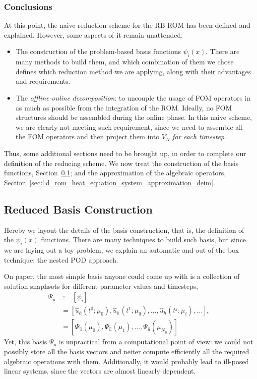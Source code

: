 \documentclass[../main.tex]{subfiles}
\begin{document}
\subsubsection{Conclusions}
At this point, the naive reduction scheme for the RB-ROM has been defined and explained.
However, some aspects of it remain unattended:
\begin{itemize}
    \item The construction of the problem-based basis functions $\psi_i(x)$.
    There are many methods to build them, and which combination of them we chose defines which reduction method we are applying, along with their advantages and requirements.
    \item The \emph{offline-online decomposition}: to uncouple the usage of FOM operators in as much as possible from the integration of the ROM. 
    Ideally, no FOM structures should be assembled during the online phase.
    In this naive scheme, we are clearly not meeting such requirement, since we need to assemble all the FOM operators and then project them into $V_N$ \emph{for each timestep}.
\end{itemize}
Thus, some additional sections need to be brought up, in order to complete our definition of the reducing scheme.
We now treat the construction of the basis functions, Section~\ref{sec:1d_rom_heat_equation_basis_construction}; and the approximation of the algebraic operators, Section~\ref{sec:1d_rom_heat_equation_system_approximation_deim}.

\subsection{Reduced Basis Construction}
\label{sec:1d_rom_heat_equation_basis_construction}
Hereby we layout the details of the basis construction, that is, the definition of the $\psi_i(x)$ functions.
There are many techniques to build such basis, but since we are laying out a toy problem, we explain an automatic and out-of-the-box technique: the nested POD approach. 

On paper, the most simple basis anyone could come up with is a collection of solution snaphsots for different parameter values and timesteps, 
\begin{align}
    \Psi_{\hat{u}} &:= [\psi_i] \nonumber \\
    &= [\hat{u}_h(t^0; \mu_0), \hat{u}_h(t^1; \mu_0), 
    \ldots, \hat{u}_h(t^j; \mu_i), \ldots], \nonumber \\
    &= [\Psi_{\hat{u}}(\mu_0), \Psi_{\hat{u}}(\mu_1), \ldots, \Psi_{\hat{u}}(\mu_{N_{\mu}})]
\end{align}
Yet, this basis $\Psi_{\hat{u}}$ is unpractical from a computational point of view: we could not possibly store all the basis vectors and neiter compute efficiently all the required algebraic operations with them.
Additionally, it would probably lead to ill-posed linear systems, since the vectors are almost linearly dependent. 
\end{document}
